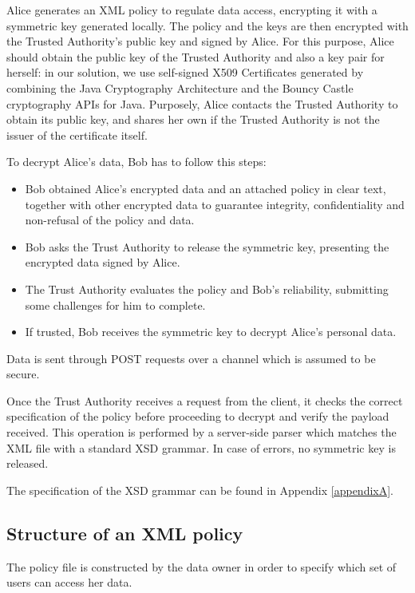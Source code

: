 Alice generates an XML policy to regulate data access, encrypting it with a symmetric key generated locally. The policy and the keys are then encrypted with the Trusted Authority's public key and signed by Alice. For this purpose, Alice should obtain the public key of the Trusted Authority and also a key pair for herself: in our solution, we use self-signed X509 Certificates generated by combining the Java Cryptography Architecture and the Bouncy Castle cryptography APIs for Java. Purposely, Alice contacts the Trusted Authority to obtain its public key, and shares her own if the Trusted Authority is not the issuer of the certificate itself.

To decrypt Alice's data, Bob has to follow this steps:
\begin{itemize}
	\item Bob obtained Alice's encrypted data and an attached policy in clear text, together with other encrypted data to guarantee integrity, confidentiality and non-refusal of the policy and data.
	\item Bob asks the Trust Authority to release the symmetric key, presenting the encrypted data signed by Alice.
	\item The Trust Authority evaluates the policy and Bob's reliability, submitting some challenges for him to complete.
	\item If trusted, Bob receives the symmetric key to decrypt Alice's personal data.
\end{itemize}

Data is sent through POST requests over a channel which is assumed to be secure.

Once the Trust Authority receives a request from the client, it checks the correct specification of the policy before proceeding to decrypt and verify the payload received. This operation is performed by a server-side parser which matches the XML file with a standard XSD grammar. In case of errors, no symmetric key is released.

The specification of the XSD grammar can be found in Appendix \ref{appendixA}. 

\subsection{Structure of an XML policy}
The policy file is constructed by the data owner in order to specify which set of users can access her data. 